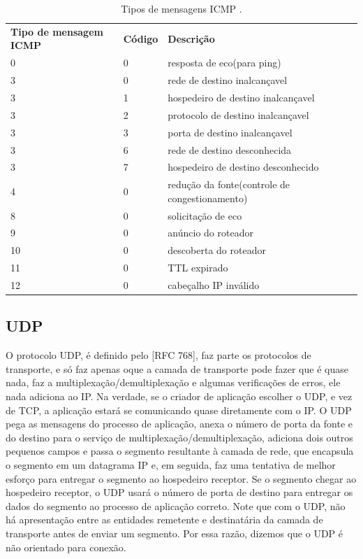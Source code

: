 \documentclass[
	article,			%
	11pt,				%
	oneside,			%
	a4paper,			%
	english,			%
	brazil,				%
	sumario=tradicional
	]{abntex2}
\begin{document}
 \begin{table}[H]
 	\centering
 	\caption{Tipos de mensagens ICMP \cite{Kurose}.}
 	\label{table-ICMP}
 	\begin{tabular}{lllll}
 		\cline{1-3}
\textbf{Tipo de mensagem ICMP} &	\textbf{Código}& \textbf{Descrição}\\ \cline{1-3}
 	    0 &   0&   resposta de eco(para ping)&    \\ \cline{1-3}
 		3 &   0&  rede de destino inalcançavel&    \\ \cline{1-3}
 		3 &   1&  hospedeiro de destino inalcançavel&    \\ \cline{1-3}
 		3 &   2&  protocolo de destino inalcançavel&   \\ \cline{1-3}
 		3 &   3&  porta de destino inalcançavel&    \\ \cline{1-3}
 		3 &   6&  rede de destino desconhecida&    \\ \cline{1-3}
 		3 &   7&  hospedeiro de destino desconhecido&     \\ \cline{1-3}
 		4 &   0&  redução da fonte(controle de congestionamento)&    \\ \cline{1-3}
 		8 &   0&  solicitação de eco&    \\ \cline{1-3}
 		9 &   0&  anúncio do roteador&    \\ \cline{1-3}
 		10 &  0&  descoberta do roteador&    \\ \cline{1-3}
 		11 &  0&  TTL expirado&    \\ \cline{1-3}
 		12 &  0&  cabeçalho IP inválido&    \\ \cline{1-3}
 	\end{tabular}
 \end{table}

\subsection{UDP}
 O protocolo UDP, é definido pelo [RFC 768], faz parte os protocolos de transporte, e só faz apenas oque a camada de transporte pode fazer que é quase nada, faz a multiplexação/demultiplexação e algumas verificações de erros, ele nada adiciona ao IP. Na verdade, se o criador de aplicação escolher o UDP, e vez de TCP, a aplicação estará se comunicando quase diretamente com o IP. O UDP pega as mensagens do processo de aplicação, anexa o número de porta da fonte e do destino para o serviço de multiplexação/demultiplexação, adiciona dois outros pequenos campos e passa o segmento resultante à camada de rede, que encapsula o segmento em um datagrama IP e, em seguida, faz uma tentativa de melhor esforço para entregar o segmento ao hospedeiro receptor. Se o segmento chegar ao hospedeiro receptor, o UDP usará o número de porta de destino para entregar os dados do segmento ao processo de aplicação correto. Note que com o UDP, não há apresentação entre as entidades remetente e destinatária da camada de transporte antes de enviar um segmento. Por essa razão, dizemos que o UDP é não orientado para conexão.\cite{Kurose}
\end{document}
